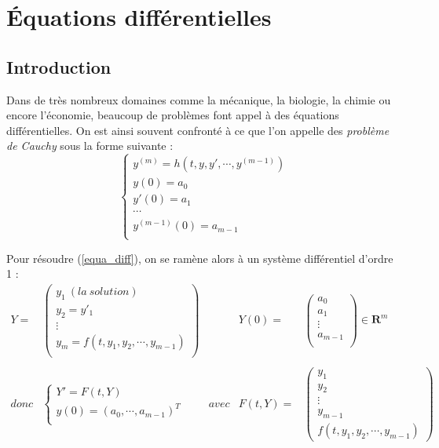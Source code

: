 \documentclass[a4paper,10pt]{report}
\begin{document}
\chapter{Équations différentielles}
\section{Introduction}
Dans de très nombreux domaines comme la mécanique, la biologie, la chimie ou encore l'économie, beaucoup de problèmes font appel à des équations différentielles. On est ainsi souvent confronté à ce que l'on appelle des \textit{problème de Cauchy} sous la forme suivante :\\
\begin{equation}
\label{equa_diff}
\left\lbrace
\begin{array}{l}
y^{(m)}=h(t,y,y',\cdots ,y^{(m-1)}) \\
y(0)=a_0 \\
y'(0)=a_1 \\
\cdots \\
y^{(m-1)}(0)=a_{m-1} \\
\end{array}\right.
\end{equation}

Pour résoudre (\ref{equa_diff}), on se ramène alors à un système différentiel d'ordre 1 :
\begin{equation}
\begin{array}{llllll}
Y= &
\left(
\begin{array}{l}
y_1 \ (la \ solution) \\
y_2=y'_1 \\
\vdots \\
y_m=f(t,y_1,y_2,\cdots ,y_{m-1}) \\
\end{array}\right)

& &
Y(0)= &
\left(
\begin{array}{c}
a_0 \\
a_1 \\
\vdots \\
a_{m-1} \\
\end{array}\right) \in \textbf{R}^m \\ \\
donc &
\left\lbrace
\begin{array}{l}
Y'=F(t,Y) \\
y(0)=(a_0,\cdots ,a_{m-1})^T \\
\end{array}\right.
& avec & F(t,Y)= &
\left(
\begin{array}{c}
y_1\\
y_2\\
\vdots \\
y_{m-1} \\
f(t,y_1,y_2,\cdots ,y_{m-1})
\end{array}\right)
\end{array}
\end{equation}
\\
\end{document}
